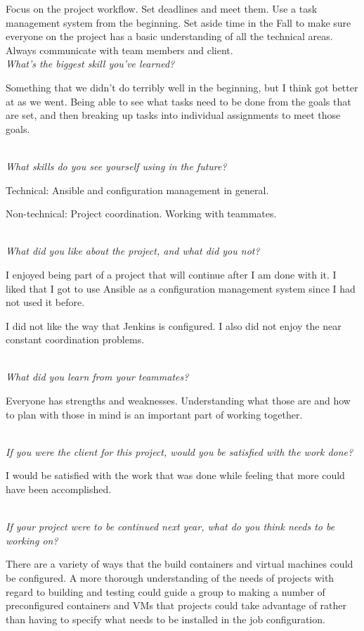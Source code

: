 \documentclass[10pt,letterpaper,onecolumn,draftclsnofoot]{IEEEtran}
\begin{document}
Focus on the project workflow. Set deadlines and meet them. Use a task management system from the beginning. Set aside time in the Fall to make sure everyone on the project has a basic understanding of all the technical areas. Always communicate with team members and client.
\textit{\\What's the biggest skill you've learned?}

Something that we didn't do terribly well in the beginning, but I think got better at as we went. Being able to see what tasks need to be done from the goals that are set, and then breaking up tasks into individual assignments to meet those goals.

\textit{\\What skills do you see yourself using in the future?}

Technical: Ansible and configuration management in general.

Non-technical: Project coordination. Working with teammates.

\textit{\\What did you like about the project, and what did you not?}

I enjoyed being part of a project that will continue after I am done with it. I liked that I got to use Ansible as a configuration management system since I had not used it before.

I did not like the way that Jenkins is configured. I also did not enjoy the near constant coordination problems.

\textit{\\What did you learn from your teammates?}

Everyone has strengths and weaknesses. Understanding what those are and how to plan with those in mind is an important part of working together.

\textit{\\If you were the client for this project, would you be satisfied with the work done?}

I would be satisfied with the work that was done while feeling that more could have been accomplished.

\textit{\\If your project were to be continued next year, what do you think needs to be working on?}

There are a variety of ways that the build containers and virtual machines could be configured. A more thorough understanding of the needs of projects with regard to building and testing could guide a group to making a number of preconfigured containers and VMs that projects could take advantage of rather than having to specify what needs to be installed in the job configuration.\\
\end{document}
